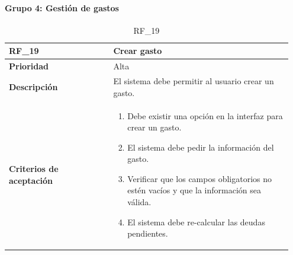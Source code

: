 \clearpage

\paragraph{Grupo 4: Gestión de gastos}
\label{subsubsec:grupo4}

\parbox{\textwidth}{ 
   
}

\begin{table}[htb!]
    \begin{tabular}{|p{0.35\linewidth}|p{0.6\linewidth}|}
        \hline
        \rowcolor[HTML]{C0C0C0}  
        \textbf{RF\_19} & \textbf{Crear gasto} \\
        \hline
        \textbf{Prioridad} & Alta \\
        \hline
        \textbf{Descripción} & El sistema debe permitir al usuario crear un gasto.  \\
        \hline
        \vspace{0.5mm}
        \textbf{Criterios de aceptación} & 
        \begin{minipage}[t]{0.9\linewidth}
            \begin{enumerate}
                \item Debe existir una opción en la interfaz para crear un gasto.
                \item El sistema debe pedir la información del gasto.
                \item Verificar que los campos obligatorios no estén vacíos y que la información sea válida.
                \item El sistema debe re-calcular las deudas pendientes.
            \end{enumerate}
            \vspace{2mm}
        \end{minipage} \\
        \hline
    \end{tabular}
    \caption{RF\_19}
    \label{req:RF19}
\end{table}

